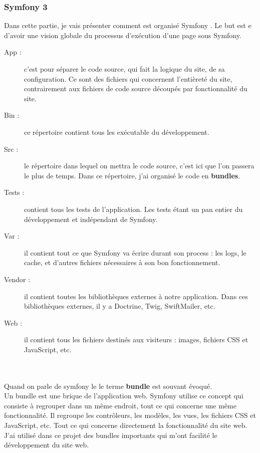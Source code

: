 \documentclass[12pt]{article}
\begin{document}
\subsubsection{Symfony 3}
Dans cette partie, je vais présenter comment est organisé Symfony . Le but est e d'avoir une vision globale du processus d'exécution d'une page sous Symfony.\\
\begin{description}
\item[App :]  c'est  pour séparer le code source, qui fait la logique du site, de sa configuration. Ce sont des fichiers qui concernent l'entièreté du site, contrairement aux fichiers de code source  découpés par fonctionnalité du site.
\item[Bin :] ce répertoire contient tous les exécutable du développement.
\item[Src :] le répertoire dans lequel on mettra le code source, c'est ici que l'on passera le plus de temps. Dans ce répertoire, j'ai organisé le code en \textbf{bundles}.
\item[Tests :] contient tous les tests de  l'application. Les tests étant un pan entier du développement et indépendant de Symfony.
\item[Var :] il contient tout ce que Symfony va écrire durant son process : les logs, le cache, et d'autres fichiers nécessaires à son bon fonctionnement.
\item[Vendor :] il contient toutes les bibliothèques externes à notre application. Dans ces bibliothèques externes, il y a Doctrine, Twig, SwiftMailer, etc.
\item[Web :] il contient tous les fichiers destinés aux visiteurs : images, fichiers CSS et JavaScript, etc. 

\end{description} \\ \\

Quand on parle de symfony le le terme \textbf{bundle} est souvant évoqué.\\
Un bundle est une brique de  l'application web. Symfony utilise ce concept  qui consiste à regrouper dans un même endroit,  tout ce qui concerne une même fonctionnalité.
Il regroupe les contrôleurs, les modèles, les vues, les fichiers CSS et JavaScript, etc. Tout ce qui concerne directement la fonctionnalité  du site web.\\
J'ai utilisé dans ce projet des bundles importants qui m'ont facilité le développement du site web.\\ \\
\end{document}
